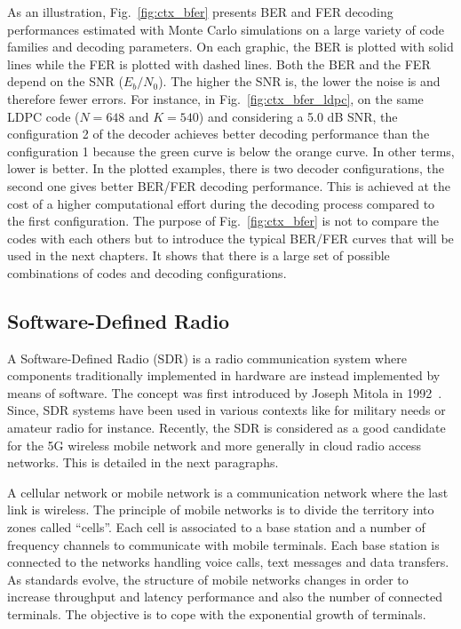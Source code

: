 As an illustration, Fig.~\ref{fig:ctx_bfer} presents BER and FER decoding
performances estimated with Monte Carlo simulations on a large variety of code
families and decoding parameters. On each graphic, the BER is plotted with solid
lines while the FER is plotted with dashed lines. Both the BER and the FER
depend on the SNR ($E_b/N_0$). The higher the SNR is, the lower the noise is and
therefore fewer errors. For instance, in Fig.~\ref{fig:ctx_bfer_ldpc}, on
the same LDPC code ($N = 648$ and $K = 540$) and considering a 5.0 dB SNR, the
configuration 2 of the decoder achieves better decoding performance than the
configuration 1 because the {\color{Paired-3} green} curve is below the
{\color{Paired-7} orange} curve. In other terms, lower is better. In the plotted
examples, there is two decoder configurations, the second one gives better
BER/FER decoding performance. This is achieved at the cost of a higher
computational effort during the decoding process compared to the first
configuration. The purpose of Fig.~\ref{fig:ctx_bfer} is not to compare the
codes with each others but to introduce the typical BER/FER curves that will be
used in the next chapters. It shows that there is a large set of possible
combinations of codes and decoding configurations.

\newpage
\subsection{Software-Defined Radio}

A Software-Defined Radio (SDR) is a radio communication system where components
traditionally implemented in hardware are instead implemented by means of
software. The concept was first introduced by Joseph Mitola in
1992~\cite{Mitola1992,Mitola1993}. Since, SDR systems have been used in various
contexts like for military needs or amateur radio for instance. Recently, the
SDR is considered as a good candidate for the 5G wireless mobile network and
more generally in cloud radio access networks. This is detailed in the next
paragraphs.

A cellular network or mobile network is a communication network where the last
link is wireless. The principle of mobile networks is to divide the territory
into zones called ``cells''. Each cell is associated to a base station and a
number of frequency channels to communicate with mobile terminals. Each base
station is connected to the networks handling voice calls, text messages and
data transfers. As standards evolve, the structure of mobile networks changes in
order to increase throughput and latency performance and also the number of
connected terminals. The objective is to cope with the exponential growth of
terminals.

